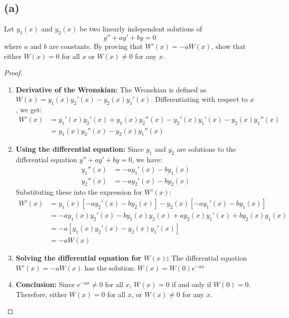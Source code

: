 \documentclass{article}
\begin{document}
\subsection*{(a)}
Let $y_1(x)$ and $y_2(x)$ be two linearly independent solutions of 
\[y'' + ay' + by = 0\]
where $a$ and $b$ are constants. By proving that $W'(x) = -aW(x)$, show that either $W(x) = 0$ for all $x$ or $W(x) \neq 0$ for any $x$.
\begin{proof}
\begin{enumerate}
\item \textbf{Derivative of the Wronskian:}
The Wronskian is defined as $W(x) = y_1(x)y_2'(x) - y_2(x)y_1'(x)$.  Differentiating with respect to $x$, we get:
\begin{align*}
W'(x) &= y_1'(x)y_2'(x) + y_1(x)y_2''(x) - y_2'(x)y_1'(x) - y_2(x)y_1''(x) \\
&= y_1(x)y_2''(x) - y_2(x)y_1''(x)
\end{align*}
\item \textbf{Using the differential equation:}
Since $y_1$ and $y_2$ are solutions to the differential equation $y'' + ay' + by = 0$, we have:
\begin{align*}
y_1''(x) &= -ay_1'(x) - by_1(x) \\
y_2''(x) &= -ay_2'(x) - by_2(x)
\end{align*}
Substituting these into the expression for $W'(x)$:
\begin{align*}
W'(x) &= y_1(x)[-ay_2'(x) - by_2(x)] - y_2(x)[-ay_1'(x) - by_1(x)] \\
&= -ay_1(x)y_2'(x) - by_1(x)y_2(x) + ay_2(x)y_1'(x) + by_2(x)y_1(x) \\
&= -a[y_1(x)y_2'(x) - y_2(x)y_1'(x)] \\
&= -aW(x)
\end{align*}
\item \textbf{Solving the differential equation for $W(x)$:}
The differential equation $W'(x) = -aW(x)$ has the solution:
$W(x) = W(0)e^{-ax}$
\item \textbf{Conclusion:}
Since $e^{-ax} \neq 0$ for all $x$, $W(x) = 0$ if and only if $W(0) = 0$. Therefore, either $W(x) = 0$ for all $x$, or $W(x) \neq 0$ for any $x$.
\end{enumerate}
\end{proof}
\end{document}
